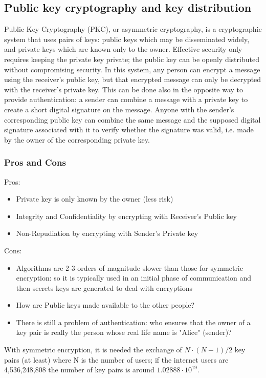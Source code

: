\documentclass[a4paper, 10pt, titlepage]{article}
\begin{document}
\subsection{Public key cryptography and key distribution}
Public Key Cryptography (PKC), or asymmetric cryptography, is a cryptographic system that uses pairs of keys: public keys which may be disseminated widely, and private keys which are known only to the owner. Effective security only requires keeping the private key private; the public key can be openly distributed without compromising security.
In this system, any person can encrypt a message using the receiver's public key, but that encrypted message can only be decrypted with the receiver's private key. This can be done also in the opposite way to provide authentication: a sender can combine a message with a private key to create a short digital signature on the message. Anyone with the sender's corresponding public key can combine the same message and the supposed digital signature associated with it to verify whether the signature was valid, i.e. made by the owner of the corresponding private key. 

\subsubsection{Pros and Cons}
Pros:
\begin{itemize}
\item Private key is only known by the owner (less risk)
\item Integrity and Confidentiality by encrypting with Receiver’s Public key
\item Non-Repudiation by encrypting with Sender’s Private key
\end{itemize}
Cons:
\begin{itemize}
\item Algorithms are 2-3 orders of magnitude slower than those for symmetric encryption: so it is typically used in an initial phase of communication and then secrets keys are generated to deal with encryptions
\item How are Public keys made available to the other people?
\item There is still a problem of authentication: who ensures that the owner of a key pair is really the person whose real life name is "Alice" (sender)?
\end{itemize}
With symmetric encryption, it is needed the exchange of $N \cdot (N-1)/2$ key pairs (at least) where N is the number of users; if the internet users are 4,536,248,808 the number of key pairs is around $1.02888 \cdot 10^{19}$.
\end{document}
